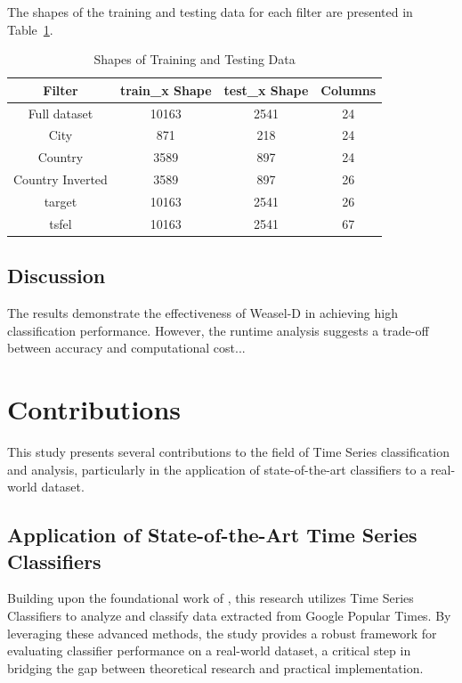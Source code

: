 \documentclass{ieeeaccess}
\begin{document}
The shapes of the training and testing data for each filter are presented in Table~\ref{table:shapes}.
    
    \begin{table}[ht]
        \centering
        \begin{tabular}{|c|c|c|c|}
        \hline
        \textbf{Filter} & \textbf{train\_x Shape} & \textbf{test\_x Shape} & \textbf{Columns} \\ \hline
        Full dataset       & 10163 & 2541 & 24 \\ \hline
        City      & 871   & 218  & 24 \\ \hline
        Country   & 3589  & 897  & 24 \\ \hline
        Country Inverted  & 3589  & 897  & 26 \\ \hline
        target    & 10163 & 2541 & 26 \\ \hline
        tsfel     & 10163 & 2541 & 67 \\ \hline
        \end{tabular}
        \caption{Shapes of Training and Testing Data}
        \label{table:shapes}
        \end{table}
        

\subsection{Discussion}
The results demonstrate the effectiveness of Weasel-D in achieving high classification performance. However, the runtime analysis suggests a trade-off between accuracy and computational cost...

\section{Contributions}

This study presents several contributions to the field of Time Series classification and analysis, particularly in the application of state-of-the-art classifiers to a real-world dataset.

\subsection{Application of State-of-the-Art Time Series Classifiers}
Building upon the foundational work of \cite{middlehurst2024bakeoff}, this research utilizes Time Series Classifiers to analyze and classify data extracted from Google Popular Times. 
By leveraging these advanced methods, the study provides a robust framework for evaluating classifier performance on a real-world dataset, a critical step in bridging the gap between theoretical research and practical implementation.
\end{document}
